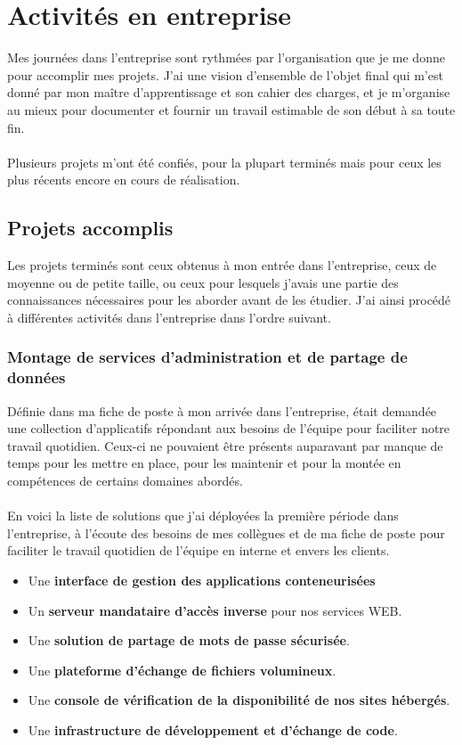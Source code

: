 \section{Activités en entreprise}

Mes journées dans l'entreprise sont rythmées par l'organisation que je me donne pour accomplir mes projets. J'ai une vision d'ensemble de l'objet final qui m'est donné par mon maître d'apprentissage et son cahier des charges, et je m'organise au mieux pour documenter et fournir un travail estimable de son début à sa toute fin.
\\ \\
Plusieurs projets m'ont été confiés, pour la plupart terminés mais pour ceux les plus récents encore en cours de réalisation.

\subsection{Projets accomplis}

Les projets terminés sont ceux obtenus à mon entrée dans l'entreprise, ceux de moyenne ou de petite taille, ou ceux pour lesquels j'avais une partie des connaissances nécessaires pour les aborder avant de les étudier. J'ai ainsi procédé à différentes activités dans l'entreprise dans l'ordre suivant.

\subsubsection{Montage de services d'administration et de partage de données}

Définie dans ma fiche de poste à mon arrivée dans l'entreprise, était demandée une collection d'applicatifs répondant aux besoins de l'équipe pour faciliter notre travail quotidien. Ceux-ci ne pouvaient être présents auparavant par manque de temps pour les mettre en place, pour les maintenir et pour la montée en compétences de certains domaines abordés.
\\ \\
En voici la liste de solutions que j'ai déployées la première période dans l'entreprise, à l'écoute des besoins de mes collègues et de ma fiche de poste pour faciliter le travail quotidien de l'équipe en interne et envers les clients.

\begin{itemize}
  \item Une \textbf{interface de gestion des applications conteneurisées}
  \item Un \textbf{serveur mandataire d'accès inverse} pour nos services WEB.
  \item Une \textbf{solution de partage de mots de passe sécurisée}.
  \item Une \textbf{plateforme d'échange de fichiers volumineux}.
  \item Une \textbf{console de vérification de la disponibilité de nos sites hébergés}.
  \item Une \textbf{infrastructure de développement et d'échange de code}.
\end{itemize}

